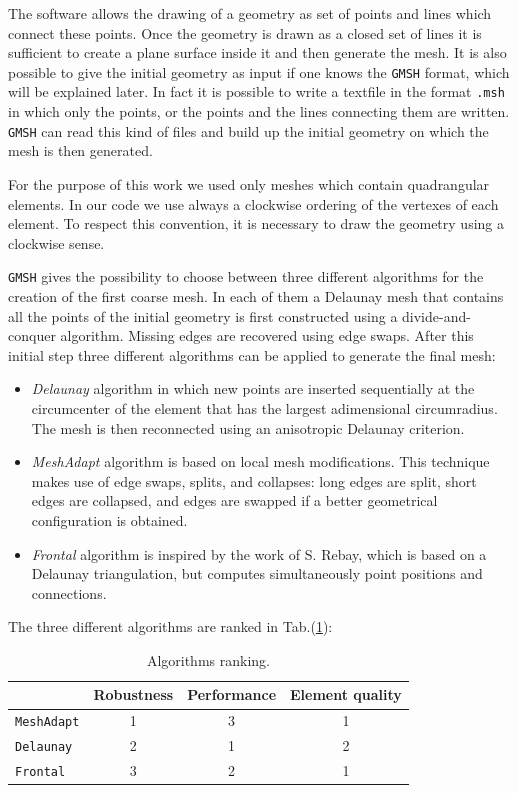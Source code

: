 The software allows the drawing of a geometry as set of points and lines which connect these points. Once the geometry is drawn as a closed set of lines it is sufficient to create a plane surface inside it and then generate the mesh. It is also possible to give the initial geometry as input if one knows the \verb|GMSH| format, which will be explained later. In fact it is possible to write a textfile in the format \verb|.msh| in which only the points, or the points and the lines connecting them are written. \verb|GMSH| can read this kind of files and build up the initial geometry on which the mesh is then generated.

For the purpose of this work we used only meshes which contain quadrangular elements. In our code we use always a clockwise ordering of the vertexes of each element. To respect this convention, it is necessary to draw the geometry using a clockwise sense.

\verb|GMSH| gives the possibility to choose between three different algorithms for the creation of the first coarse mesh. In each of them a Delaunay mesh that contains all the points of the initial geometry is first constructed using a divide-and-conquer algorithm. Missing edges are recovered using edge swaps. After this initial step three different algorithms can be applied to generate the final mesh:

\begin{itemize}
\item \textit{Delaunay} algorithm in which new points are inserted sequentially at the circumcenter of the element that has the largest adimensional circumradius. The mesh is then reconnected using an anisotropic Delaunay criterion.
\item \textit{MeshAdapt} algorithm is based on local mesh modifications. This technique makes use of edge swaps, splits, and collapses: long edges are split, short edges are collapsed, and edges are swapped if a better geometrical configuration is obtained.
\item \textit{Frontal} algorithm is inspired by the work of S. Rebay, which is based on a Delaunay triangulation, but computes simultaneously point positions and connections.
\end{itemize}

The three different algorithms are ranked in Tab.(\ref{tab:rank}):

\begin{table}
\centering
\begin{tabular}{|l|c|c|c|}
\hline
 & Robustness & Performance & Element quality\\
\hline
\verb|MeshAdapt| & 1 & 3 & 1\\
\hline
\verb|Delaunay| & 2 & 1 & 2\\
\hline
\verb|Frontal| & 3 & 2 & 1\\
\hline
\end{tabular}
\caption{Algorithms ranking.}
\label{tab:rank}
\end{table}

